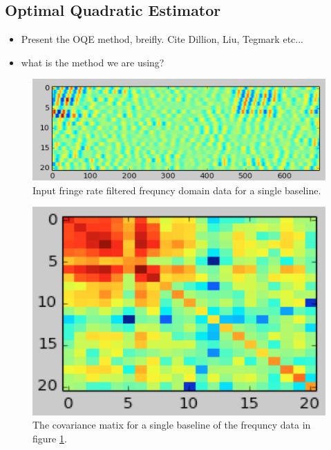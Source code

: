 \documentclass[twocolumn,numberedappendix]{emulateapj}
\begin{document}
\subsection{Optimal Quadratic Estimator}
\begin{itemize}
    \item{Present the OQE method, breifly. Cite Dillion, Liu, Tegmark etc...}
    \item{what is the method we are using?}
\end{itemize}

\begin{figure}[h!]\centering
\includegraphics[width=2\columnwidth, height=.8\columnwidth]{plots/x_example.png}
\caption{Input fringe rate filtered frequncy domain data for a single baseline.}
\label{fig:x_example}
\end{figure}

\begin{figure}[h!]\centering
\includegraphics[width=\columnwidth, height=.8\columnwidth]{plots/C_example.png}
\caption{The covariance matix for a single baseline of the frequncy data in
figure \ref{fig:x_example}.} 
\label{fig:C_example}
\end{figure}
\end{document}
